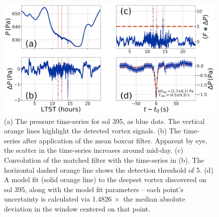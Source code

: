 \documentclass{aastex63}
\begin{document}
\begin{figure}
    \centering
    \includegraphics[width=\textwidth]{figures/data_conditioning_and_fit.png}
    \caption{(a) The pressure time-series for sol 395, as blue dots. The vertical orange lines highlight the detected vortex signals. (b) The time-series after application of the mean boxcar filter. Apparent by eye, the scatter in the time-series increases around mid-day. (c) Convolution of the matched filter with the time-series in (b). The horizontal dashed orange line shows the detection threshold of 5. (d) A model fit (solid orange line) to the deepest vortex discovered on sol 395, along with the model fit parameters -- each point's uncertainty is calculated via $1.4826\ \times$ the median absolute deviation in the window centered on that point.}
    \label{fig:data_conditioning_and_fit}
\end{figure}
\end{document}
